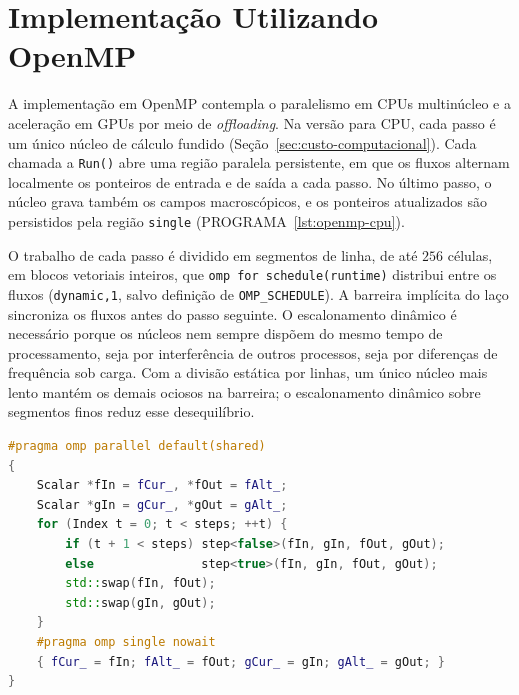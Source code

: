 
\section{Implementação Utilizando OpenMP}\label{sec:implementacao-computacional-utilizando-openmp}

A implementação em OpenMP contempla o paralelismo em CPUs multinúcleo e a aceleração em GPUs por meio de \textit{offloading}.
Na versão para CPU, cada passo é um único núcleo de cálculo fundido (Seção~\ref{sec:custo-computacional}).
Cada chamada a \texttt{Run()} abre uma região paralela persistente, em que os fluxos alternam localmente os ponteiros de entrada e de saída a cada passo.
No último passo, o núcleo grava também os campos macroscópicos, e os ponteiros atualizados são persistidos pela região \texttt{single} (PROGRAMA~\ref{lst:openmp-cpu}).

O trabalho de cada passo é dividido em segmentos de linha, de até $256$ células, em blocos vetoriais inteiros, que \texttt{omp for schedule(runtime)} distribui entre os fluxos (\texttt{dynamic,1}, salvo definição de \texttt{OMP\_SCHEDULE}).
A barreira implícita do laço sincroniza os fluxos antes do passo seguinte.
O escalonamento dinâmico é necessário porque os núcleos nem sempre dispõem do mesmo tempo de processamento, seja por interferência de outros processos, seja por diferenças de frequência sob carga.
Com a divisão estática por linhas, um único núcleo mais lento mantém os demais ociosos na barreira; o escalonamento dinâmico sobre segmentos finos reduz esse desequilíbrio.

\noindent\begin{minipage}{\linewidth}
\begin{lstlisting}[language=C++, caption={Região paralela persistente e alternância dos ponteiros na versão OpenMP para CPU.}, label={lst:openmp-cpu}]
#pragma omp parallel default(shared)
{
    Scalar *fIn = fCur_, *fOut = fAlt_;
    Scalar *gIn = gCur_, *gOut = gAlt_;
    for (Index t = 0; t < steps; ++t) {
        if (t + 1 < steps) step<false>(fIn, gIn, fOut, gOut);
        else               step<true>(fIn, gIn, fOut, gOut);
        std::swap(fIn, fOut);
        std::swap(gIn, gOut);
    }
    #pragma omp single nowait
    { fCur_ = fIn; fAlt_ = fOut; gCur_ = gIn; gAlt_ = gOut; }
}
\end{lstlisting}
\end{minipage}


